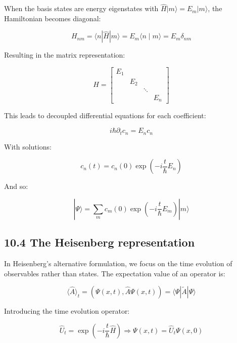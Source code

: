 \documentclass[italian]{HKNdocument}
\begin{document}
When the basis states are energy eigenstates with $\hat{H}|m\rangle=E_{m}|m\rangle$, the Hamiltonian becomes diagonal:

\begin{equation*}
H_{n m}=\langle n| \hat{H}|m\rangle=E_{m}\langle n \mid m\rangle=E_{m} \delta_{n m} \tag{10.23}
\end{equation*}

Resulting in the matrix representation:

\[
H=\left[\begin{array}{llll}
E_{1} & & &  \tag{10.24}\\
& E_{2} & & \\
& & \ddots & \\
& & & E_{n}
\end{array}\right]
\]

This leads to decoupled differential equations for each coefficient:

\begin{equation*}
i \hbar \partial_{t} c_{n}=E_{n} c_{n} \tag{10.25}
\end{equation*}

With solutions:

\begin{equation*}
c_{n}(t)=c_{n}(0) \exp \left(-i \frac{t}{\hbar} E_{n}\right) \tag{10.26}
\end{equation*}


And so:

\begin{equation*}
|\Psi\rangle=\sum_{m} c_{m}(0) \exp \left(-i \frac{t}{\hbar} E_{m}\right)|m\rangle \tag{10.27}
\end{equation*}

\subsection*{10.4 The Heisenberg representation}
In Heisenberg's alternative formulation, we focus on the time evolution of observables rather than states. The expectation value of an operator is:

\begin{equation*}
\langle\hat{A}\rangle_{t}=(\Psi(x, t), \hat{A} \Psi(x, t))=\langle\Psi| \tilde{A}|\Psi\rangle \tag{10.28}
\end{equation*}

Introducing the time evolution operator:

\begin{equation*}
\hat{U}_{t}=\exp \left(-i \frac{t}{\hbar} \hat{H}\right) \Longrightarrow \Psi(x, t)=\hat{U}_{t} \Psi(x, 0) \tag{10.29}
\end{equation*}
\end{document}
